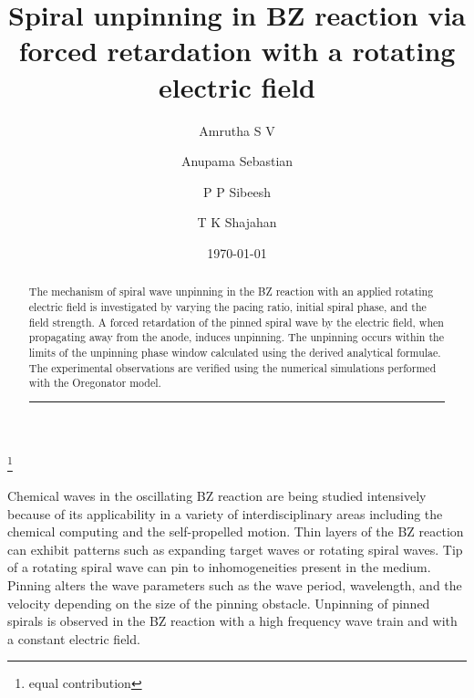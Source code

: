 \documentclass[%
 preprint,
 amsmath,amssymb,
 aps,
]{revtex4-2}
\begin{document}

\title{Spiral unpinning in BZ reaction via forced retardation with a rotating electric field }%


\author{Amrutha S V}
\thanks{equal contribution}%
\author{Anupama Sebastian}%

\author{P P Sibeesh}

\author{T K Shajahan}


\date{\today}%

\begin{abstract}
The mechanism of spiral wave unpinning in the BZ reaction with an applied rotating electric field is investigated by varying the pacing ratio, initial spiral phase, and the field strength. A forced retardation of the pinned spiral wave by the electric field, when propagating away from the anode, induces unpinning. The unpinning occurs within the limits of the unpinning phase window calculated using the derived analytical formulae. The experimental observations are verified using the numerical simulations performed with the Oregonator model.
\vspace{5pt}
\hrule
\vspace{5pt} 
\end{abstract}

                             
\maketitle



Chemical waves in the oscillating BZ reaction are being studied intensively because of its applicability in a variety of interdisciplinary areas including the chemical computing and the self-propelled motion. Thin layers of the BZ reaction can exhibit patterns such as expanding target waves or rotating spiral waves. Tip of a rotating spiral wave can pin to inhomogeneities present in the medium. Pinning alters the wave parameters such as the wave period, wavelength, and the velocity depending on the size of the pinning obstacle. Unpinning of pinned spirals is observed in the BZ reaction with a high frequency wave train and with a constant electric field.
\end{document}
